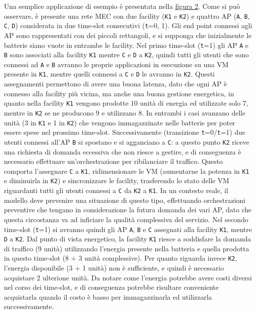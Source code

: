 Una semplice applicazione di esempio è presentata nella \hyperref[fig:esempio-assegnamenti]{figura 2}. Come si può osservare, è presente una rete MEC con due facility (\texttt{K1} e \texttt{K2}) e quattro AP (\texttt{A}, \texttt{B}, \texttt{C}, \texttt{D}) considerata in due time-slot consecutivi (\texttt{t}=0, 1). Gli end point connessi agli AP sono rappresentati con dei piccoli rettangoli, e si supponga che inizialmente le batterie siano vuote in entrambe le facility. Nel primo time-slot (\texttt{t}=1) gli AP \texttt{A} e \texttt{B} sono associati alla facility \texttt{K1} mentre \texttt{C} e \texttt{D} a \texttt{K2}, quindi tutti gli utenti che sono connessi ad \texttt{A} e \texttt{B} avranno le proprie applicazioni in esecuzione su una VM presente in \texttt{K1}, mentre quelli connessi a \texttt{C} e \texttt{D} le avranno in \texttt{K2}. Questi assegnamenti permettono di avere una buona latenza, dato che ogni AP è connesso alla facility più vicina, ma anche una buona gestione energetica, in quanto nella facility \texttt{K1} vengono prodotte 10 unità di energia ed utilizzate solo 7, mentre in \texttt{K2} se ne producono 9 e utilizzano 8. In entrambi i casi avanzano delle unità (3 in \texttt{K1} e 1 in \texttt{K2}) che vengono immagazzinate nelle batterie per poter essere spese nel prossimo time-slot. Successivamente (transizione \texttt{t}=0/\texttt{t}=1) due utenti connessi all'AP \texttt{B} si spostano e si agganciano a \texttt{C}: a questo punto \texttt{K2} riceve una richiesta di domanda eccessiva che non riesce a gestire, e di conseguenza è necessario effettuare un'orchestrazione per ribilanciare il traffico. Questo comporta l'assegnare \texttt{C} a \texttt{K1}, ridimensionare le VM (aumentarne la potenza in \texttt{K1} e diminuirla in \texttt{K2}) e sincronizzare le facility, trasferendo lo stato delle VM riguardanti tutti gli utenti connessi a \texttt{C} da \texttt{K2} a \texttt{K1}. In un contesto reale, il modello deve prevenire una situazione di questo tipo, effettuando orchestrazioni preventive che tengano in considerazione la futura domanda dei vari AP, dato che questa circostanza va ad inficiare la qualità complessiva del servizio. Nel secondo time-slot (\texttt{t}=1) si avranno quindi gli AP \texttt{A}, \texttt{B} e \texttt{C} assegnati alla facility \texttt{K1}, mentre \texttt{D} a \texttt{K2}. Dal punto di vista energetico, la facility \texttt{K1} riesce a soddisfare la domanda di traffico (9 unità) utilizzando l'energia presente nella batteria e quella prodotta in questo time-slot (8 + 3 unità complessive). Per quanto riguarda invece \texttt{K2}, l'energia disponibile (3 + 1 unità) non è sufficiente, e quindi è necessario acquistare 2 ulterione unità. Da notare come l'energia potrebbe avere costi diversi nel corso dei time-slot, e di conseguenza potrebbe risultare conveniente acquistarla quando il costo è basso per immagazzinarla ed utilizzarla successivamente.


